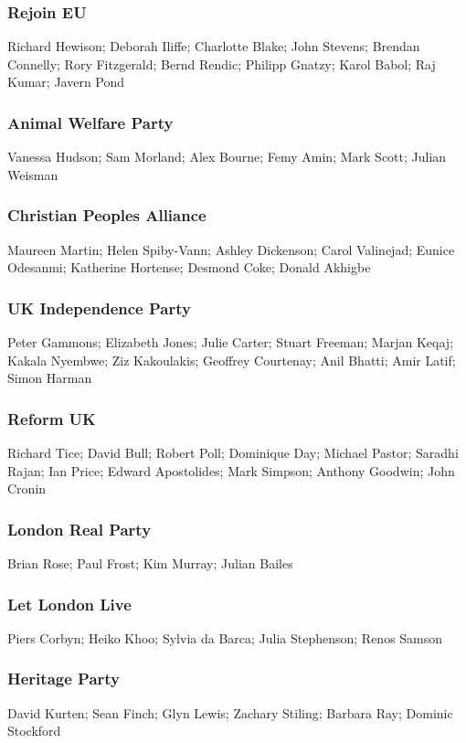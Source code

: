\begin{resultsiii}
	\subsubsection*{Rejoin EU}
	Richard Hewison; Deborah Iliffe; Charlotte Blake; John Stevens; Brendan Connelly; Rory Fitzgerald; Bernd Rendic; Philipp Gnatzy; Karol Babol; Raj Kumar; Javern Pond

	\subsubsection*{Animal Welfare Party}
	Vanessa Hudson; Sam Morland; Alex Bourne; Femy Amin; Mark Scott; Julian Weisman
	
	\subsubsection*{Christian Peoples Alliance}
	Maureen Martin; Helen Spiby-Vann; Ashley Dickenson; Carol Valinejad; Eunice Odesanmi; Katherine Hortense; Desmond Coke; Donald Akhigbe
	
	\subsubsection*{UK Independence Party}
	Peter Gammons; Elizabeth Jones; Julie Carter; Stuart Freeman; Marjan Keqaj; Kakala Nyembwe; Ziz Kakoulakis; Geoffrey Courtenay; Anil Bhatti; Amir Latif; Simon Harman

	\subsubsection*{Reform UK}
	Richard Tice; David Bull; Robert Poll; Dominique Day; Michael Pastor; Saradhi Rajan; Ian Price; Edward Apostolides; Mark Simpson; Anthony Goodwin; John Cronin
	
	\subsubsection*{London Real Party}
	Brian Rose; Paul Frost; Kim Murray; Julian Bailes
	
	\subsubsection*{Let London Live}
	Piers Corbyn; Heiko Khoo; Sylvia da Barca; Julia Stephenson; Renos Samson

	\subsubsection*{Heritage Party}
	David Kurten; Sean Finch; Glyn Lewis; Zachary Stiling; Barbara Ray; Dominic Stockford
	

\end{resultsiii}
